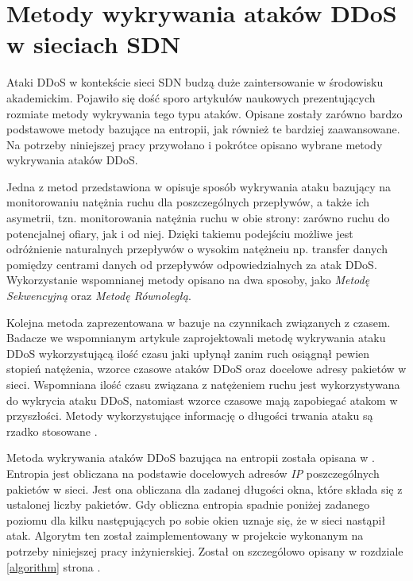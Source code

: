 \section{Metody wykrywania ataków DDoS w sieciach SDN}

Ataki DDoS w kontekście sieci SDN budzą duże zaintersowanie w środowisku
akademickim. Pojawiło się dość sporo artykułów naukowych prezentujących rozmiate
metody wykrywania tego typu ataków. Opisane zostały zarówno bardzo podstawowe
metody bazujące na entropii, jak również te bardziej zaawansowane. Na potrzeby
niniejszej pracy przywołano i pokrótce opisano wybrane metody wykrywania
ataków DDoS. 

Jedna z metod przedstawiona w \cite{ddosNYarticle} opisuje sposób wykrywania
ataku bazujący na monitorowaniu natężnia ruchu dla poszczególnych przepływów, a
także ich asymetrii, tzn. monitorowania natężnia ruchu w obie strony: zarówno
ruchu do potencjalnej ofiary, jak i od niej. Dzięki takiemu podejściu możliwe
jest odróżnienie naturalnych przepływów o wysokim natężneiu np. transfer danych
pomiędzy centrami danych od przepływów odpowiedzialnych za atak DDoS.
Wykorzystanie wspomnianej metody opisano na dwa sposoby, jako \textit{Metodę
  Sekwencyjną} oraz \textit{Metodę Równoległą}. 

Kolejna metoda zaprezentowana w \cite{ddoskoreaarticle} bazuje na czynnikach
związanych z czasem. Badacze we wspomnianym artykule zaprojektowali metodę
wykrywania ataku DDoS wykorzystującą ilość czasu jaki upłynął zanim ruch
osiągnął pewien stopień natężenia, wzorce czasowe ataków DDoS oraz docelowe
adresy pakietów w sieci. Wspomniana ilość czasu związana z natężeniem ruchu jest
wykorzystywana do wykrycia ataku DDoS, natomiast wzorce czasowe mają zapobiegać
atakom w przyszłości. Metody wykorzystujące informację o długości trwania ataku
są rzadko stosowane \cite{ddoskoreaarticle}. 

Metoda wykrywania ataków DDoS bazująca na entropii została opisana w
\cite{mainddosarticle}. Entropia jest obliczana na podstawie docelowych adresów
\textit{IP} poszczególnych pakietów w sieci. Jest ona obliczana dla zadanej
długości okna, które składa się z ustalonej liczby pakietów. Gdy obliczna
entropia spadnie poniżej zadanego poziomu dla kilku następujących po sobie okien
uznaje się, że w sieci nastąpił atak. Algorytm ten został zaimplementowany w
projekcie wykonanym na potrzeby niniejszej pracy inżynierskiej. Został on
szczególowo opisany w rozdziale \ref{algorithm} strona \pageref{algorithm}.

